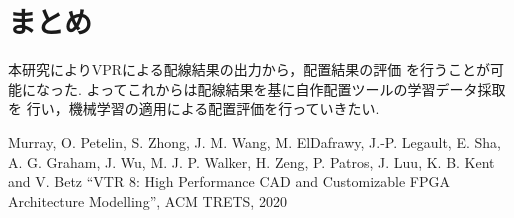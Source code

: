 \documentclass[uplatex]{jsarticle}
\begin{document}
    \section{まとめ}
        本研究によりVPRによる配線結果の出力から，配置結果の評価
        を行うことが可能になった.
        よってこれからは配線結果を基に自作配置ツールの学習データ採取を
        行い，機械学習の適用による配置評価を行っていきたい.
    \begin{thebibliography}{2}
        \small
        Murray, O. Petelin, S. Zhong, J. M. Wang, M. ElDafrawy, J.-P. Legault, 
        E. Sha, A. G. Graham, J. Wu, M. J. P. Walker, H. Zeng, P. Patros, J. Luu, K. B. Kent and V. Betz “VTR 8:
        High Performance CAD and Customizable FPGA Architecture Modelling”, ACM TRETS, 2020
    \end{thebibliography}
\end{document}
